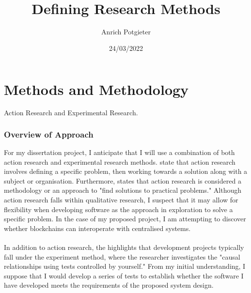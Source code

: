 \documentclass[12pt]{article}
\title{Defining Research Methods}
\author{Anrich Potgieter}
\date{24/03/2022}
\begin{document}
\maketitle
\tableofcontents

\section{Methods and Methodology}

Action Research and Experimental Research.

\subsubsection{Overview of Approach}

For my dissertation project, I anticipate that I will use a combination of both action research and experimental research methods.
\autocite{dawsonChapterResearchMethods2015} state that action research involves defining a specific problem, then working towards a solution along with a subject or organisation.
Furthermore, \autocite{blairChapterChoosingMethodology2016} states that action research is considered a methodology or an approach to "find solutions to practical problems." 
Although action research falls within qualitative research, I suspect that it may allow for flexibility when developing software as the approach in exploration to solve a specific problem. In the case of my proposed project, I am attempting to discover whether blockchains can interoperate with centralised systems.
\\\\
In addition to action research, the \autocite{dawsonChapterResearchMethods2015} highlights that development projects typically fall under the experiment method, where the researcher investigates the "causal relationships using tests controlled by yourself."
From my initial understanding, I suppose that I would develop a series of tests to establish whether the software I have developed meets the requirements of the proposed system design.

\printbibliography
\end{document}
